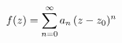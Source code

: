 \documentclass[preview]{standalone}
\begin{document}
\begin{align*}
\special{dvisvgm:raw <g id='unique000'>}f(z) = \sum_{n=0}^{\infty} a_n\,(z-z_0)^n\special{dvisvgm:raw </g>}
\end{align*}
\end{document}
